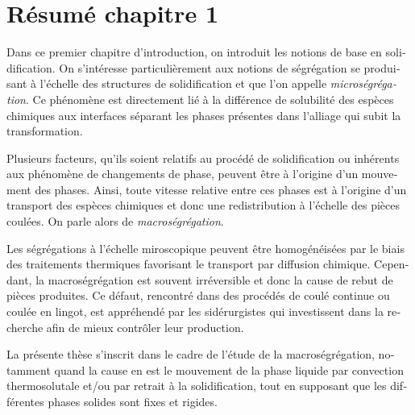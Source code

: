 \clearpage
\section*{Résumé chapitre 1}

\begin{otherlanguage}{french}
{\small

Dans ce premier chapitre d'introduction, on introduit les notions de base en solidification. 
On s'intéresse particulièrement aux notions de ségrégation se produisant à l'échelle des structures 
de solidification et que l'on appelle \emph{microségrégation}. Ce phénomène est directement lié à la 
différence de solubilité des espèces chimiques aux interfaces séparant les phases présentes dans 
l'alliage qui subit la transformation.


Plusieurs facteurs, qu'ils soient relatifs au procédé de solidification ou inhérents aux phénomène de changements de phase,
peuvent être à l'origine d'un mouvement des phases. 
Ainsi, toute vitesse relative entre ces phases est à l'origine d'un transport des espèces chimiques
et donc une redistribution à l'échelle des pièces coulées. On parle alors de \emph{macroségrégation}.


Les ségrégations à l'échelle miroscopique peuvent être homogénéisées par le biais 
des traitements thermiques favorisant le transport par diffusion chimique.
Cependant, la macroségrégation est souvent irréversible et donc la cause de rebut de pièces produites. 
Ce défaut, rencontré dans des procédés de coulé continue ou coulée en lingot, est appréhendé par les
sidérurgistes qui investissent dans la recherche afin de mieux contrôler leur production.

La présente thèse s'inscrit dans le cadre de l'étude de la macroségrégation, notamment quand la cause en est
le mouvement de la phase liquide par convection thermosolutale et/ou par retrait à la solidification, tout en supposant
que les différentes phases solides sont fixes et rigides.


}
\end{otherlanguage}
